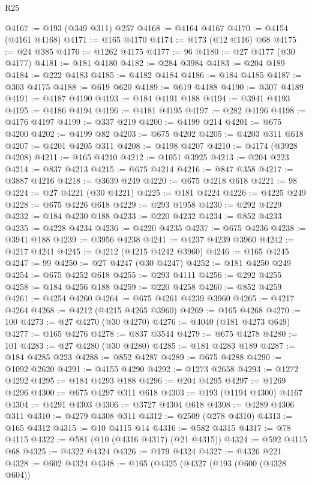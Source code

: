 \begin{lexlean}{R25}
\begin{coremodule}
@4167 := @193 (@349 @311) @257
@4168 := @4164 @4167
@4170 := @4154 (@4161 @4168)
@4171 := @165 @4170
@4174 := @173 (@12 @116) @68
@4175 := @24 @385
@4176 := @1262 @4175
@4177 := 96
@4180 := @27 @4177 (@30 @4177)
@4181 := @181 @4180
@4182 := @284 @3984
@4183 := @204 @189
@4184 := @222 @4183
@4185 := @4182 @4184
@4186 := @184 @4185
@4187 := @303 @4175
@4188 := @619 @620
@4189 := @619 @4188
@4190 := @307 @4189
@4191 := @4187 @4190
@4193 := @184 @4191 @188
@4194 := @3941 @4193
@4195 := @4186 @4194
@4196 := @4181 @4195
@4197 := @282 @4196
@4198 := @4176 @4197
@4199 := @337 @219
@4200 := @4199 @214
@4201 := @675 @4200
@4202 := @4199 @82
@4203 := @675 @4202
@4205 := @4203 @311 @618
@4207 := @4201 @4205 @311
@4208 := @4198 @4207
@4210 := @4174 (@3928 @4208)
@4211 := @165 @4210
@4212 := @1051 @3925
@4213 := @204 @223
@4214 := @837 @4213
@4215 := @675 @4214
@4216 := @847 @358
@4217 := @3887 @4216
@4218 := @3639 @249
@4220 := @675 @4218 @618
@4221 := 98
@4224 := @27 @4221 (@30 @4221)
@4225 := @181 @4224
@4226 := @4225 @249
@4228 := @675 @4226 @618
@4229 := @293 @1958
@4230 := @292 @4229
@4232 := @184 @4230 @188
@4233 := @220 @4232
@4234 := @852 @4233
@4235 := @4228 @4234
@4236 := @4220 @4235
@4237 := @675 @4236
@4238 := @3941 @188
@4239 := @3956 @4238
@4241 := @4237 @4239 @3960
@4242 := @4217 @4241
@4245 := @4212 (@4215 @4242 @3960)
@4246 := @165 @4245
@4247 := 99
@4250 := @27 @4247 (@30 @4247)
@4252 := @181 @4250 @249
@4254 := @675 @4252 @618
@4255 := @293 @4111
@4256 := @292 @4255
@4258 := @184 @4256 @188
@4259 := @220 @4258
@4260 := @852 @4259
@4261 := @4254 @4260
@4264 := @675 @4261 @4239 @3960
@4265 := @4217 @4264
@4268 := @4212 (@4215 @4265 @3960)
@4269 := @165 @4268
@4270 := 100
@4273 := @27 @4270 (@30 @4270)
@4276 := @4040 (@181 @4273 @649)
@4277 := @165 @4276
@4278 := @837 @3544
@4279 := @675 @4278
@4280 := 101
@4283 := @27 @4280 (@30 @4280)
@4285 := @181 @4283 @189
@4287 := @184 @4285 @223
@4288 := @852 @4287
@4289 := @675 @4288
@4290 := @1092 @2620
@4291 := @4155 @4290
@4292 := @1273 @2658
@4293 := @1272 @4292
@4295 := @184 @4293 @188
@4296 := @204 @4295
@4297 := @1269 @4296
@4300 := @675 @4297 @311 @618
@4303 := @193 (@1194 @4300) @4167
@4304 := @4291 @4303
@4306 := @3727 @4304 @618
@4308 := @4289 @4306 @311
@4310 := @4279 @4308 @311
@4312 := @2509 (@278 @4310)
@4313 := @165 @4312
@4315 := @10 @4115 @14
@4316 := @582 @4315
@4317 := @78 @4115
@4322 := @581 (@10 (@4316 @4317) (@21 @4315))
@4324 := @592 @4115 @68
@4325 := @4322 @4324
@4326 := @179 @4324
@4327 := @4326 @221
@4328 := @602 @4324
@4348 := @165
    (@4325
      (@4327
        (@193
          (@600 (@4328 @604))

\end{coremodule}
\end{lexlean}
